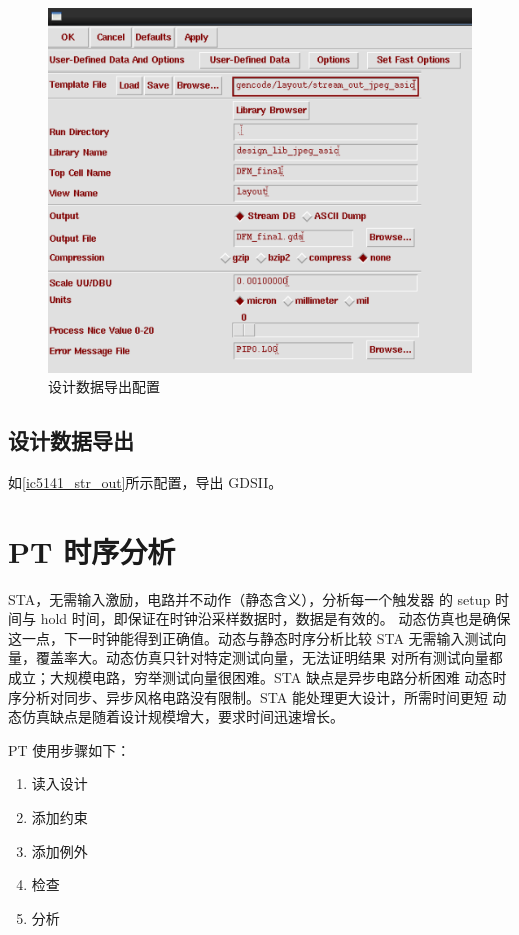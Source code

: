 \documentclass[12pt,hyperref,a4paper,UTF8]{ctexart}
\begin{document}
\begin{figure}[htbp]
\begin{minipage}{0.45\textwidth}
        \includegraphics[width =1\textwidth]{figures/ic5141_str_out.png}
        \caption{设计数据导出配置}
        \label{ic5141_str_out}
    \end{minipage}
\end{figure}



\subsection{设计数据导出}
如\autoref{ic5141_str_out}所示配置，导出 GDSII。



\newpage
\section{PT 时序分析}
STA，无需输入激励，电路并不动作（静态含义），分析每一个触发器
的 setup 时间与 hold 时间，即保证在时钟沿采样数据时，数据是有效的。
动态仿真也是确保这一点，下一时钟能得到正确值。动态与静态时序分析比较
STA 无需输入测试向量，覆盖率大。动态仿真只针对特定测试向量，无法证明结果
对所有测试向量都成立；大规模电路，穷举测试向量很困难。STA 缺点是异步电路分析困难
动态时序分析对同步、异步风格电路没有限制。STA 能处理更大设计，所需时间更短
动态仿真缺点是随着设计规模增大，要求时间迅速增长。

PT 使用步骤如下：
\begin{enumerate}
    \item 读入设计
    \item 添加约束
    \item 添加例外
    \item 检查
    \item 分析
\end{enumerate}
\end{document}
